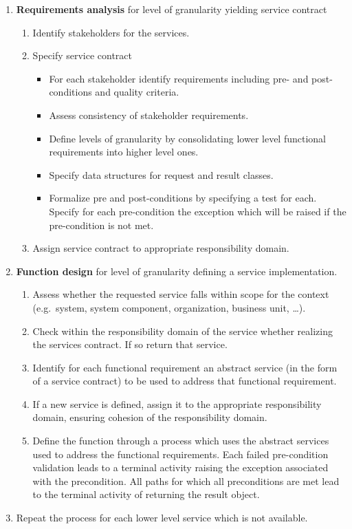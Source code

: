 \begin{enumerate}
 \item {\bf Requirements analysis} for level of granularity yielding service contract
  \begin{enumerate}
    \item Identify stakeholders for the services.
    \item Specify service contract 
      \begin{itemize}
       \item For each stakeholder identify requirements including pre- and post-conditions and quality criteria.
       \item Assess consistency of stakeholder requirements.
       \item Define levels of granularity by consolidating lower level functional requirements into higher level ones. 
       \item Specify data structures for request and result classes.
       \item Formalize pre and post-conditions by specifying a test for each. Specify for each pre-condition the exception which will be raised if the pre-condition is not met.
     \end{itemize}
    \item Assign service contract to appropriate responsibility domain.
  \end{enumerate}

 \item {\bf Function design} for level of granularity defining a service implementation.
      \begin{enumerate}
	\item Assess whether the requested service falls within scope for the context (e.g.\ system, system component, organization, business unit, \dots).
	\item Check within the responsibility domain of the service whether realizing the services contract. If so return that service.
        \item Identify for each functional requirement an abstract service (in the form of a service contract) to be used to address that functional requirement.
	\item If a new service is defined, assign it to the appropriate responsibility domain, ensuring cohesion of the responsibility domain. 
	\item Define the function through a process which uses the abstract services used to address the functional requirements. Each failed pre-condition validation leads to a terminal activity raising the exception associated with the precondition. All paths for which all preconditions are met lead to the terminal activity of returning the result object.
      \end{enumerate}

  \item Repeat the process for each lower level service which is not available.
\end{enumerate}

